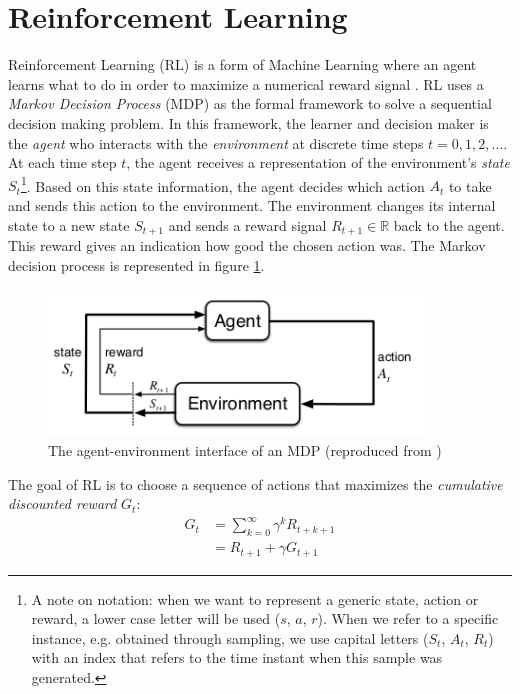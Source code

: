 \section{Reinforcement Learning}
\label{sec:intro_rl}
Reinforcement Learning (RL) is a form of Machine Learning where an agent learns what to do in order to maximize a numerical reward signal \cite{sutton2018reinforcement}. RL uses a \emph{Markov Decision Process} (MDP) as the formal framework to solve a sequential decision making problem. In this framework, the learner and decision maker is the \emph{agent} who interacts with the \emph{environment} at discrete time steps $t=0, 1, 2, \ldots$. At each time step $t$, the agent receives a representation of the environment's \emph{state} $S_t$\footnote{A note on notation: when we want to represent a generic state, action or reward, a lower case letter will be used ($s$, $a$, $r$). When we refer to a specific instance, e.g. obtained through sampling, we use capital letters ($S_t$, $A_t$, $R_t$) with an index that refers to the time instant when this sample was generated.}. Based on this state information, the agent decides which action $A_t$ to take and sends this action to the environment. The environment changes its internal state to a new state $S_{t+1}$ and sends a reward signal $R_{t+1} \in \mathbb{R}$ back to the agent. This reward gives an indication how good the chosen action was. The Markov decision process is represented in figure \ref{fig:mdp}.\\
\begin{figure}[htp]
    \centering
    \includegraphics[width=10cm]{images/mdp.png}
    \caption{The agent-environment interface of an MDP (reproduced from \cite{sutton2018reinforcement})}
    \label{fig:mdp}
\end{figure}
The goal of RL is to choose a sequence of actions that maximizes the \emph{cumulative discounted reward} $G_t$:
\begin{equation}
\begin{split}
    G_t &= \sum_{k=0}^{\infty} \gamma^k R_{t+k+1} \\
        &= R_{t+1} + \gamma G_{t+1}
\end{split}
\label{eqn:cum_reward}
\end{equation}

